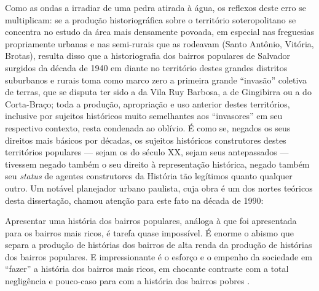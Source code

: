 Como as ondas a irradiar de uma pedra atirada à água, os reflexos deste erro se multiplicam: se a produção historiográfica sobre o território soteropolitano se concentra no estudo da área mais densamente povoada, em especial nas freguesias propriamente urbanas e nas semi-rurais que as rodeavam (Santo Antônio, Vitória, Brotas), resulta disso que a historiografia dos bairros populares de Salvador surgidos da década de 1940 em diante no território destes grandes distritos suburbanos e rurais toma como marco zero a primeira grande ``invasão'' coletiva de terras, que se disputa ter sido a da Vila Ruy Barbosa, a de Gingibirra ou a do Corta-Braço; toda a produção, apropriação e uso anterior destes territórios, inclusive por sujeitos históricos muito semelhantes aos ``invasores'' em seu respectivo contexto, resta condenada ao oblívio. É como se, negados os seus direitos mais básicos por décadas, os sujeitos históricos construtores destes territórios populares --- sejam os do século XX, sejam seus antepassados ---  tivessem negado também o seu direito à representação histórica, negado também seu \textit{status} de agentes construtores da História tão legítimos quanto qualquer outro. Um notável planejador urbano paulista, cuja obra é um dos nortes teóricos desta dissertação, chamou atenção para este fato na década de 1990:

\begin{citacao}
Apresentar uma história dos bairros populares, análoga à que foi apresentada para os bairros mais ricos, é tarefa quase impossível. É enorme o abismo que separa a produção de histórias dos bairros de alta renda da produção de histórias dos bairros populares. E impressionante é o esforço e o empenho da sociedade em ``fazer'' a história dos bairros mais ricos, em chocante contraste com a total negligência e pouco-caso para com a história dos bairros pobres \cite[p.~226]{villaca_intraurbano_2017}.
\end{citacao}



